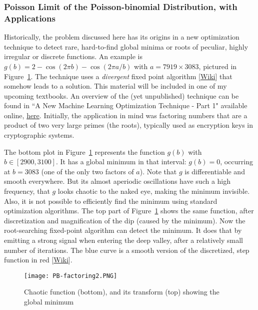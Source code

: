 \documentclass[10pt]{article}
\begin{document}
\subsubsection{Poisson Limit of the Poisson-binomial Distribution, with Applications}\label{slogs}


Historically, the problem discussed here has its origins in a new optimization technique to detect rare, hard-to-find global minima or roots of peculiar, highly irregular or discrete functions. An example is $g(b) = 2 - \cos(2\pi b) - \cos(2\pi a/b)$ with $a = 7919 \times 3083$,  pictured in Figure~\ref{fig:pbfactor}. The technique uses a {\em divergent}
fixed point algorithm [\href{https://en.wikipedia.org/wiki/Fixed-point_iteration}{Wiki}]
that somehow leads to a solution. This material will be included in one of my upcoming textbooks.
An overview of the (yet unpublished) technique can be found in  ``A New Machine Learning Optimization Technique - Part 1" available online,
\href{https://www.vgranville.com/2022/02/a-new-machine-learning-optimization.html}{here}.  Initially, the application in mind was factoring numbers that are a product of two very large primes (the roots), typically used as encryption keys in cryptographic systems.

The bottom plot in Figure~\ref{fig:pbfactor} represents the function $g(b)$ with
$b\in [2900, 3100]$. It has a global minimum in that interval: $g(b)=0$, occurring at $b=3083$ (one of the only two factors of $a$). Note that $g$ is differentiable and smooth everywhere. But its almost aperiodic oscillations have such a high frequency, that $g$ looks chaotic to the naked eye, making the minimum invisible. Also, it is not possible to efficiently find the minimum using standard optimization algorithms. The top part of Figure~\ref{fig:pbfactor} shows the same function, after discretization and magnification of the dip (caused by the minimum). Now the root-searching fixed-point algorithm can detect the minimum. It does that by emitting a strong signal when entering the deep valley, after a relatively small number of iterations. The blue curve is a smooth version of the discretized,  step function in red [\href{https://en.wikipedia.org/wiki/Step_function}{Wiki}].


\begin{figure}%
\centering
\texttt{[image: PB-factoring2.PNG]}
\caption{Chaotic function (bottom), and its transform (top) showing the global minimum}
\label{fig:pbfactor}
\end{figure}
\end{document}
